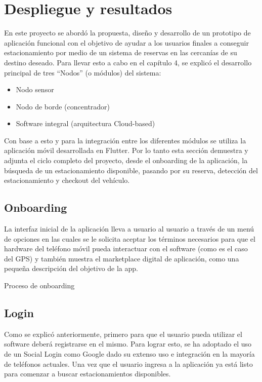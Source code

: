 \clearpage
\section{Despliegue y resultados}
En este proyecto se abordó la propuesta, diseño y desarrollo de un prototipo de aplicación funcional con el objetivo de ayudar a los usuarios finales a conseguir estacionamiento por medio de un sistema de reservas en las cercanías de su destino deseado.
Para llevar esto a cabo en el capítulo 4, se explicó el desarrollo principal de tres “Nodos” (o módulos) del sistema:

\begin{itemize}
    \item Nodo sensor
    \item Nodo de borde (concentrador)
    \item Software integral (arquitectura Cloud-based)
\end{itemize}

Con base a esto y para la integración entre los diferentes módulos se utiliza la aplicación móvil desarrollada en Flutter. Por lo tanto esta sección demuestra y adjunta el ciclo completo del proyecto, desde el onboarding de la aplicación, la búsqueda de un estacionamiento disponible, pasando por su reserva, detección del estacionamiento y checkout del vehículo.

\subsection{Onboarding}
La interfaz inicial de la aplicación lleva a usuario al usuario a través de un menú de opciones en las cuales se le solicita aceptar los términos necesarios para que el hardware del teléfono móvil pueda interactuar con el software (como es el caso del GPS) y también muestra el marketplace digital de aplicación, como una pequeña descripción del objetivo de la app.

\begin{images}[\label{onboarding_process}]{Proceso de onboarding}
\end{images}

\subsection{Login}
Como se explicó anteriormente, primero para que el usuario pueda utilizar el software deberá registrarse en el mismo. Para lograr esto, se ha adoptado el uso de un Social Login como Google dado su extenso uso e integración en la mayoría de teléfonos actuales. Una vez que el usuario ingresa a la aplicación ya está listo para comenzar a buscar estacionamientos disponibles.

